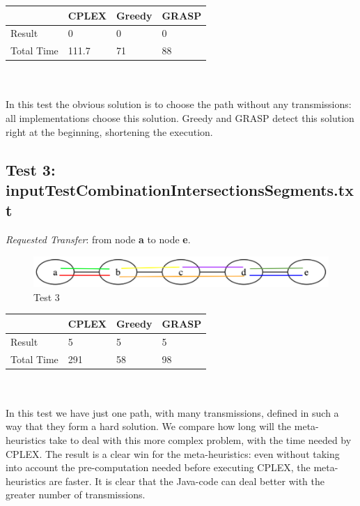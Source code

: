 \documentclass[11pt,a4paper]{article}
\begin{document}
\begin{tabular}{| l | l | l | l |}
\hline
 & CPLEX & Greedy & GRASP \\ \hline
Result & 0 & 0 & 0 \\ \hline
Total Time & 111.7 & 71 & 88 \\ \hline
\end{tabular}\\\\

In this test the obvious solution is to choose the path without any transmissions: all implementations choose this solution. Greedy and GRASP detect this solution right at the beginning, shortening the execution.

\subsection{Test 3: inputTestCombinationIntersectionsSegments.txt}

\textit{Requested Transfer}: from node \textbf{a} to node \textbf{e}.\\

\begin{figure}[H]
  \centering
    \includegraphics[scale=0.7]{inputTestCombinationIntersectionsSegments.png}
  \caption{Test 3}
  \label{fig:test3}
\end{figure}

\begin{tabular}{| l | l | l | l |}
\hline
 & CPLEX & Greedy & GRASP \\ \hline
Result & 5 & 5 & 5 \\ \hline
Total Time & 291 & 58 & 98 \\ \hline
\end{tabular}\\\\

In this test we have just one path, with many transmissions, defined in such a way that they form a hard solution. We compare how long will the meta-heuristics take to deal with this more complex problem, with the time needed by CPLEX. The result is a clear win for the meta-heuristics: even without taking into account the pre-computation needed before executing CPLEX, the meta-heuristics are faster. It is clear that the Java-code can deal better with the greater number of transmissions.
\end{document}
